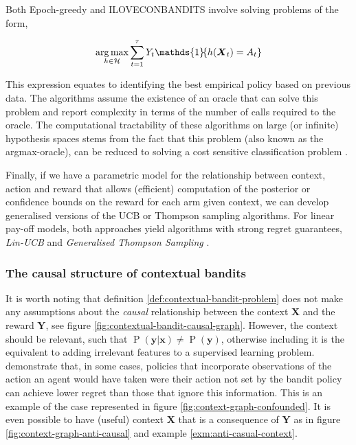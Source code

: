 \documentclass[11pt,a4paper,oneside]{book}
\newcommand{\set}[1]{\left\{#1\right\}}
\newcommand{\ind}[1]{\mathds{1}\!\!\set{#1}}
\newcommand{\argmax}{\operatornamewithlimits{arg\,max}}
\newcommand{\eqn}[1]{\begin{align}#1\end{align}}
\renewcommand{\P}[1]{\operatorname{P}\left(#1\right)}
\renewcommand{\vec}[1]{\boldsymbol{#1}}
\theoremstyle{plain}
\theoremstyle{definition}
\begin{document}
Both Epoch-greedy and ILOVECONBANDITS involve solving problems of the form,

\eqn{
\argmax_{h \in \mathcal{H}} \sum_{t=1}^\tau Y_t \ind{h(\vec{X}_t) = A_t}
}

This expression equates to identifying the best empirical policy based on previous data. The algorithms assume the existence of an oracle that can solve this problem and report complexity in terms of the number of calls required to the oracle. The computational tractability of these algorithms on large (or infinite) hypothesis spaces stems from the fact that this problem (also known as the argmax-oracle), can be reduced to solving a cost sensitive classification problem \citep{Dudik2011a}. 

Finally, if we have a parametric model for the relationship between context, action and reward that allows (efficient) computation of the posterior or confidence bounds on the reward for each arm given context, we can develop generalised versions of the UCB or Thompson sampling algorithms. For linear pay-off models, both approaches yield algorithms with strong regret guarantees, \emph{Lin-UCB} \citep{li2010contextual} and \emph{Generalised Thompson Sampling} \citep{Agrawal2013}. 

\subsubsection{The causal structure of contextual bandits}

It is worth noting that definition \ref{def:contextual-bandit-problem} does not make any assumptions about the \emph{causal} relationship between the context $\vec{X}$ and the reward $\vec{Y}$, see figure \ref{fig:contextual-bandit-causal-graph}. However, the context should be relevant, such that $\P{\vec{y}|\vec{x}} \neq \P{\vec{y}}$, otherwise including it is the equivalent to adding irrelevant features to a supervised learning problem. \citet{Bareinboim2015} demonstrate that, in some cases, policies that incorporate observations of the action an agent would have taken were their action not set by the bandit policy can achieve lower regret than those that ignore this information. This is an example of the case represented in figure \ref{fig:context-graph-confounded}. It is even possible to have (useful) context $\vec{X}$ that is a consequence of $\vec{Y}$ as in figure \ref{fig:context-graph-anti-causal} and example \ref{exm:anti-casual-context}.
\end{document}
